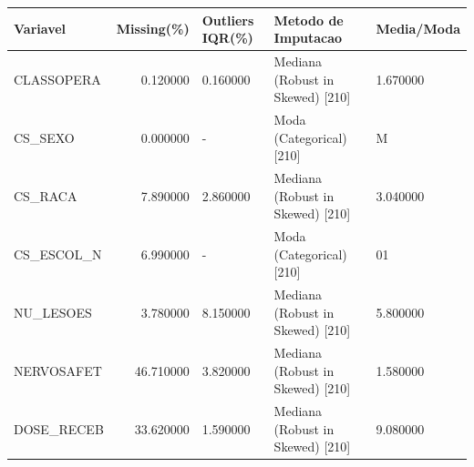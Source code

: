 \begin{tabular}{lrlll}
\toprule
Variavel & Missing(\%) & Outliers IQR(\%) & Metodo de Imputacao & Media/Moda \\
\midrule
CLASSOPERA & 0.120000 & 0.160000 & Mediana (Robust in Skewed) [210] & 1.670000 \\
CS\_SEXO & 0.000000 & - & Moda (Categorical) [210] & M \\
CS\_RACA & 7.890000 & 2.860000 & Mediana (Robust in Skewed) [210] & 3.040000 \\
CS\_ESCOL\_N & 6.990000 & - & Moda (Categorical) [210] & 01 \\
NU\_LESOES & 3.780000 & 8.150000 & Mediana (Robust in Skewed) [210] & 5.800000 \\
NERVOSAFET & 46.710000 & 3.820000 & Mediana (Robust in Skewed) [210] & 1.580000 \\
DOSE\_RECEB & 33.620000 & 1.590000 & Mediana (Robust in Skewed) [210] & 9.080000 \\
\bottomrule
\end{tabular}
